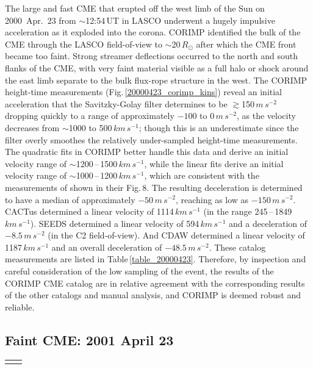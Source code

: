 \documentclass[referee,a4paper,12pt,traditabstract]{swsc}
\begin{document}
\begin{linenumbers}
The large and fast CME that erupted off the west limb of the Sun on 2000~Apr.~23 from $\sim$12:54\,UT in LASCO underwent a hugely impulsive acceleration as it exploded into the corona. CORIMP identified the bulk of the CME through the LASCO field-of-view to $\sim$20\,$R_\odot$ after which the CME front became too faint. Strong streamer deflections occurred to the north and south flanks of the CME, with very faint material visible as a full halo or shock around the east limb separate to the bulk flux-rope structure in the west. The CORIMP height-time measurements (Fig.\,\ref{20000423_corimp_kins}) reveal an initial acceleration that the Savitzky-Golay filter determines to be $\gtrsim$150\,$m\,s^{-2}$ dropping quickly to a range of approximately $-100$ to 0\,$m\,s^{-2}$, as the velocity decreases from $\sim$1000 to 500\,$km\,s^{-1}$; though this is an underestimate since the filter overly smoothes the relatively under-sampled height-time measurements. The quadratic fits in CORIMP better handle this data and derive an initial velocity range of $\sim$1200\,--\,1500\,$km\,s^{-1}$, while the linear fits derive an initial velocity range of $\sim$1000\,--\,1200\,$km\,s^{-1}$, which are consistent with the measurements of \cite{2009A&A...495..325B} shown in their Fig.\,8. The resulting deceleration is determined to have a median of approximately $-50\,m\,s^{-2}$, reaching as low as $-150\,m\,s^{-2}$. CACTus determined a linear velocity of 1114$\,km\,s^{-1}$ (in the range 245\,--\,1849\,$km\,s^{-1}$). SEEDS determined a linear velocity of 594\,$km\,s^{-1}$ and a deceleration of $-8.5\,m\,s^{-2}$ (in the C2 field-of-view). And CDAW determined a linear velocity of 1187$\,km\,s^{-1}$ and an overall deceleration of $-48.5\,m\,s^{-2}$. These catalog measurements are listed in Table\,\ref{table_20000423}. Therefore, by inspection and careful consideration of the low sampling of the event, the results of the CORIMP CME catalog are in relative agreement with the corresponding results of the other catalogs and manual analysis, and CORIMP is deemed robust and reliable.


\subsection{Faint CME: 2001 April 23}
\label{sect_20010423}

\begin{table}[h]
\begin{tabular}{l*{4}{c}r}
\multicolumn{5}{c}{} \\


\end{tabular}
\end{table}
\end{linenumbers}
\end{document}
